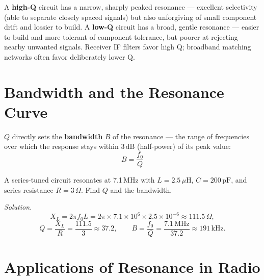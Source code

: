 \begin{keyidea}
A \textbf{high-Q} circuit has a narrow, sharply peaked resonance ---
excellent selectivity (able to separate closely spaced signals) but also
unforgiving of small component drift and lossier to build. A
\textbf{low-Q} circuit has a broad, gentle resonance --- easier to build
and more tolerant of component tolerance, but poorer at rejecting
nearby unwanted signals. Receiver IF filters favor high Q; broadband
matching networks often favor deliberately lower Q.
\end{keyidea}

\section{Bandwidth and the Resonance Curve}

$Q$ directly sets the \textbf{bandwidth} $B$ of the resonance --- the
range of frequencies over which the response stays within
$3\,\text{dB}$ (half-power) of its peak value:
\[
\boxed{B = \frac{f_0}{Q}}
\]

\begin{center}
\end{center}

\begin{examplebox}
A series-tuned circuit resonates at 7.1\,MHz with $L=2.5\,\mu$H,
$C=200\,\text{pF}$, and series resistance $R=3\,\Omega$. Find $Q$ and the
bandwidth.

\emph{Solution.}
\[
X_L = 2\pi f_0 L = 2\pi\times7.1\times10^6\times2.5\times10^{-6} \approx 111.5\,\Omega,
\]
\[
Q = \frac{X_L}{R} = \frac{111.5}{3} \approx 37.2, \qquad
B = \frac{f_0}{Q} = \frac{7.1\,\text{MHz}}{37.2} \approx 191\,\text{kHz}.
\]
\end{examplebox}

\section{Applications of Resonance in Radio}

